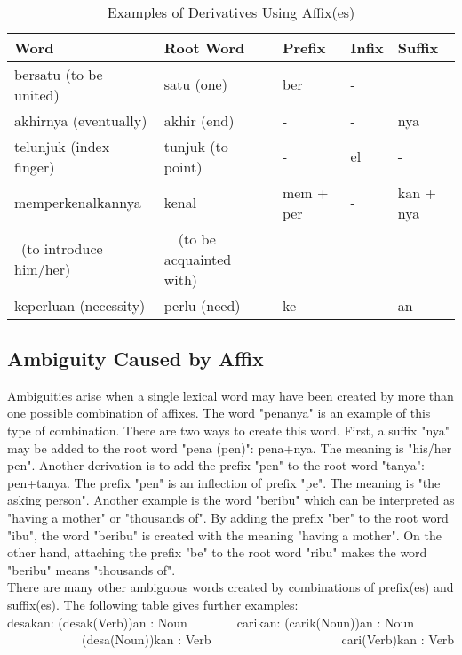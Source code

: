 \documentclass[english]{nlp}
\begin{document}
\begin{table}[ht]
\begin{center}
\caption{Examples of Derivatives Using Affix(es)}
~\\\vspace{-2mm}
\label{table:examples_of_derivation}
\begin{tabular}{lllll}
\hline
Word & Root Word & Prefix & Infix & Suffix\\
\hline
bersatu (to be united) & satu (one) & ber & - &\\
akhirnya (eventually) & akhir (end) & - & - & nya\\
telunjuk (index finger) & tunjuk (to point) & - & el & -\\
memperkenalkannya & kenal & mem + per & - & kan + nya\\
~(to introduce him/her) & ~~(to be acquainted with) & & &\\
keperluan (necessity) & perlu (need) & ke & -  & an\\
\hline
\end{tabular}
\end{center}
\end{table}
\vspace{-7mm}
\subsection{Ambiguity Caused by Affix}
Ambiguities arise when a single lexical word may have been created by more
than one possible combination of affixes.
The word "penanya" is an example of this type of combination. There are two
ways to create this word.
First, a suffix "nya" may be added to the root word "pena (pen)":
pena+nya. The meaning is "his/her pen".
Another derivation is to add the prefix "pen" to the root word "tanya":
pen+tanya. The prefix "pen" is an inflection of prefix "pe".
The meaning is "the asking person".
Another example is the word "beribu" which can be
interpreted as "having a mother" or "thousands of".
By adding the prefix "ber" to the root word "ibu", the word 
"beribu" is created with the meaning "having a mother".
On the other hand, attaching the prefix "be" to the root word "ribu" makes
the word "beribu" means "thousands of".
\\There are many other ambiguous words created by combinations
of prefix(es) and suffix(es).
The following table gives further examples:\\
desakan: (desak(Verb))an : Noun~~~~~~~~carikan: (carik(Noun))an : Noun\\
~~~~~~~~~~~~(desa(Noun))kan : Verb~~~~~~~~~~~~~~~~~~~~~cari(Verb)kan : Verb
\vspace{-2mm}
\end{document}
